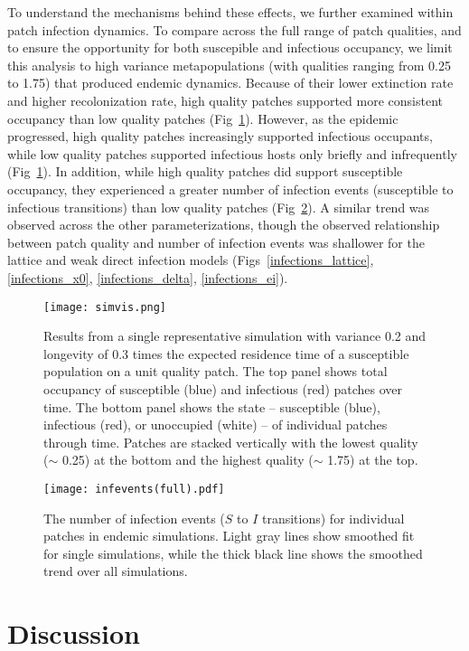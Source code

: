 \documentclass{svjour3}
\begin{document}
To understand the mechanisms behind these effects, we further examined within patch infection dynamics.  To compare across the full range of patch qualities, and to ensure the opportunity for both suscepible and infectious occupancy, we limit this analysis to high variance metapopulations (with qualities ranging from 0.25 to 1.75) that produced endemic dynamics.  Because of their lower extinction rate and higher recolonization rate, high quality patches supported more consistent occupancy than low quality patches (Fig~\ref{simvis}).  However, as the epidemic progressed, high quality patches increasingly supported infectious occupants, while low quality patches supported infectious hosts only briefly and infrequently (Fig~\ref{simvis}).  In addition, while high quality patches did support susceptible occupancy, they experienced a greater number of infection events (susceptible to infectious transitions) than low quality patches (Fig~\ref{infections}).  A similar trend was observed across the other parameterizations, though the observed relationship between patch quality and number of infection events was shallower for the lattice and weak direct infection models (Figs~\ref{infections_lattice}, \ref{infections_x0}, \ref{infections_delta}, \ref{infections_ei}).

\begin{figure}
\centering
\texttt{[image: simvis.png]}
\caption{Results from a single representative simulation with variance 0.2 and longevity of 0.3 times the expected residence time of a susceptible population on a unit quality patch.  The top panel shows total occupancy of susceptible (blue) and infectious (red) patches over time.  The bottom panel shows the state -- susceptible (blue), infectious (red), or unoccupied (white) -- of individual patches through time.  Patches are stacked vertically with the lowest quality ($\sim$ 0.25) at the bottom and the highest quality ($\sim$ 1.75) at the top.}
\label{simvis}
\end{figure}


\begin{figure}
\centering
\texttt{[image: infevents(full).pdf]}
\caption{The number of infection events ($S$ to $I$ transitions) for individual patches in endemic simulations.  Light gray lines show smoothed fit for single simulations, while the thick black line shows the smoothed trend over all simulations.}
\label{infections}
\end{figure}


\section{Discussion}
\label{discussion} 
\end{document}
